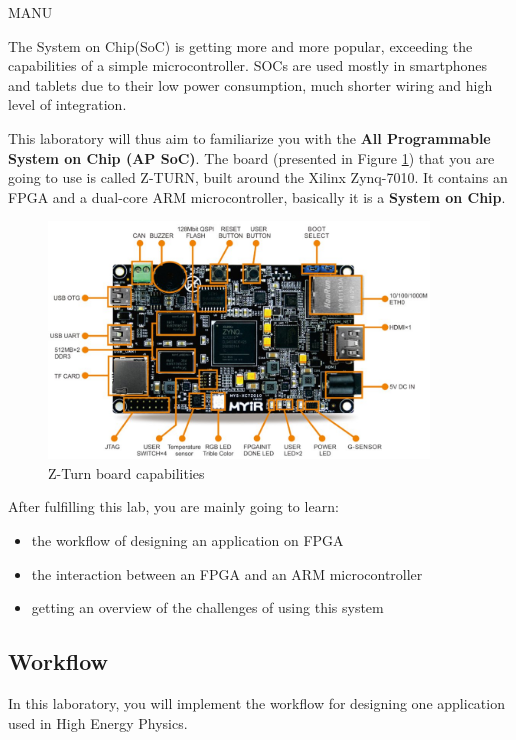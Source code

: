 \documentclass{article}
\begin{document}
{\color{red}MANU}

The System on Chip(SoC) is getting more and more popular, exceeding the capabilities of a simple microcontroller. SOCs are used mostly in smartphones and tablets due to their low power consumption, much shorter wiring and high level of integration.

This laboratory will thus aim to familiarize you with the \textbf{All Programmable System on Chip (AP SoC)}. The board (presented in Figure \ref{fig:zturnboard}) that you are going to use is called Z-TURN, built around the Xilinx Zynq-7010. It contains an FPGA and a dual-core ARM microcontroller, basically it is a \textbf{System on Chip}.


\begin{figure}[h!]
    \centering
    \includegraphics[width=0.9\textwidth]{img/zturn_details.jpg}
    \caption{Z-Turn board capabilities}
    \label{fig:zturnboard}
\end{figure}

After fulfilling this lab, you are mainly going to learn:
\begin{itemize}
\item the workflow of designing an application on FPGA
\item the interaction between an FPGA and an ARM microcontroller
\item getting an overview of the challenges of using this system
\end{itemize}



\subsection{Workflow}




In this laboratory, you will implement the workflow for designing one application used in
High Energy Physics.
\end{document}
